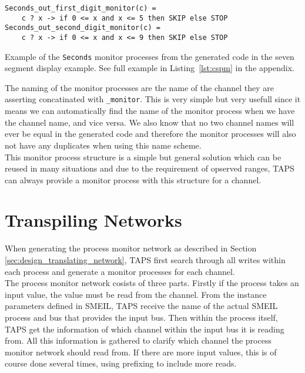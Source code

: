 \begin{listing}
\begin{verbatim}
Seconds_out_first_digit_monitor(c) =
    c ? x -> if 0 <= x and x <= 5 then SKIP else STOP
Seconds_out_second_digit_monitor(c) =
    c ? x -> if 0 <= x and x <= 9 then SKIP else STOP
\end{verbatim}
\caption{Example of the \texttt{Seconds} monitor processes from the generated \cspm{} code in the seven segment display example. See full example in Listing~\ref{lst:cspm} in the appendix.}
\label{lst:monitor_range_cspm}
\end{listing}
The naming of the monitor processes are the name of the channel they are asserting concatinated with \texttt{\_monitor}. This is very simple but very usefull since it means we can automatically find the name of the monitor process when we have the channel name, and vice versa. We also know that no two channel names will ever be equal in the generated \cspm{} code and therefore the monitor processes will also not have any duplicates when using this name scheme. \\

This monitor process structure is a simple but general solution which can be reused in many situations and due to the requirement of opserved ranges, TAPS can always provide a monitor process with this structure for a channel.



\section{Transpiling Networks}
When generating the process monitor network as described in Section \ref{sec:design_translating_network}, TAPS first search through all writes within each process and generate a monitor processes for each channel.\\

The process monitor network cosists of three parts. Firstly if the process takes an input value, the value must be read from the channel. From the instance parameters defined in SMEIL, TAPS receive the name of the actual SMEIL process and bus that provides the input bus. Then within the process itself, TAPS get the information of which channel within the input bus it is reading from. All this information is gathered to clarify which \cspm{} channel the process monitor network should read from. If there are more input values, this is of course done several times, using prefixing to include more reads.


